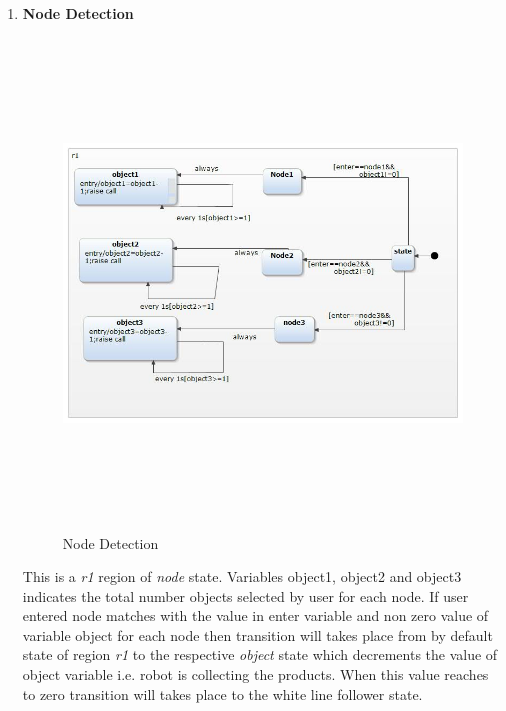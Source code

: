 \documentclass[a4paper,12pt,oneside]{article}
\begin{document}
\begin{enumerate}
\item \textbf{Node Detection}\\
\begin{figure}[H]
\centering
\includegraphics[width=17cm,height=13cm]{47.jpg}
\caption{Node Detection}
\end{figure}

This is a \emph{r1} region of \emph{node} state. Variables object1, object2 and object3 indicates the total number objects selected by user for each node. If user entered node matches with the value in enter variable and non zero value of variable object for each node then transition will takes place from by default state of region \emph{r1} to the respective \emph{object} state which decrements the value of object variable i.e. robot is collecting the products. When this value reaches to zero transition will takes place to the white line follower state. \\
\newpage


\end{enumerate}
\end{document}

